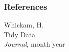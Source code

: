 \documentclass{beamer}
\begin{document}
\begin{frame}
\frametitle{References}
\footnotesize{
	\begin{thebibliography}{99} %
		
		 Whickam, H. \\
		\newblock Tidy Data\\
		\newblock \emph{Journal}, month year
		
	\end{thebibliography}
}
\end{frame}
    
\end{document}
